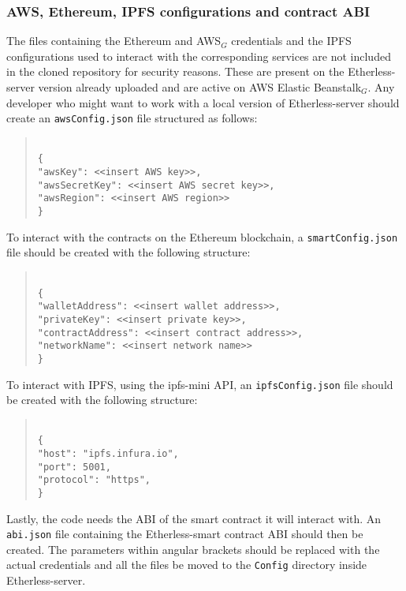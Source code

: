 \subsubsection{AWS, Ethereum, IPFS configurations and contract ABI}
The files containing the Ethereum and AWS$_{G}$ credentials and the IPFS configurations used to interact with the corresponding services are not included in the cloned repository for security reasons. These are present on the Etherless-server version already uploaded and are active on AWS Elastic Beanstalk$_{G}$.
Any developer who might want to work with a local version of Etherless-server should create an \texttt{awsConfig.json} file structured as follows:
\begin{quote}
\texttt{ \\
	\{\\
		"awsKey": <<insert AWS key>>, \\
		"awsSecretKey": <<insert AWS secret key>>, \\
		"awsRegion": <<insert AWS region>> \\
	\}\\
}
\pagebreak
\end{quote}
To interact with the contracts on the Ethereum blockchain, a \texttt{smartConfig.json} file should be created with the following structure:
\begin{quote}
	\texttt{ \\
		\{\\
		"walletAddress": <<insert wallet address>>, \\
		"privateKey": <<insert private key>>, \\
		"contractAddress": <<insert contract address>>, \\
		"networkName": <<insert network name>> \\
		\}\\
	}
\end{quote}
To interact with IPFS, using the ipfs-mini API, an \texttt{ipfsConfig.json} file should be created with the following structure:
\begin{quote}
	\texttt{ \\
		\{\\
		"host": "ipfs.infura.io", \\
		"port": 5001, \\
		"protocol": "https", \\
		\}\\
	}
\end{quote}
Lastly, the code needs the ABI of the smart contract it will interact with. An \texttt{abi.json} file containing the Etherless-smart contract ABI should then be created.
The parameters within angular brackets should be replaced with the actual credentials and all the files be moved to the \texttt{Config} directory inside Etherless-server.
